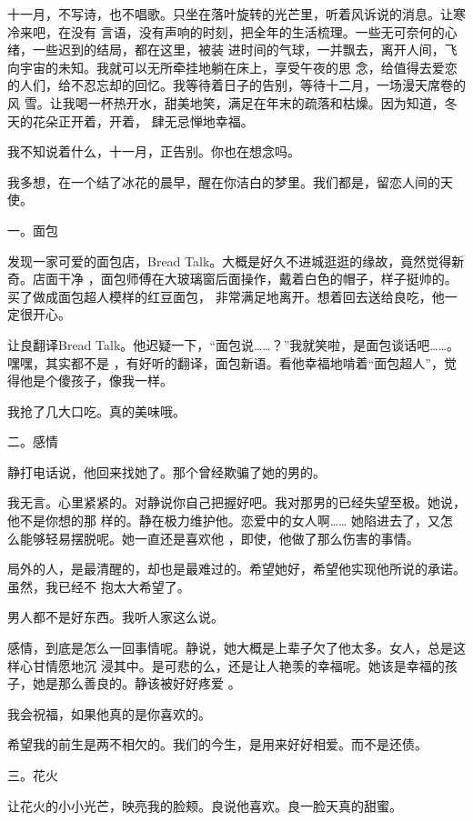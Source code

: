 \documentclass[12pt,a4paper]{article}
\newcommand{\subpart}[1]{
	\begingroup \par
	\vspace{1ex} \centering #1
	\par \endgroup \nopagebreak[4]
}
\begin{document}
		十一月，不写诗，也不唱歌。只坐在落叶旋转的光芒里，听着风诉说的消息。让寒冷来吧，在没有
	言语，没有声响的时刻，把全年的生活梳理。一些无可奈何的心绪，一些迟到的结局，都在这里，被装
	进时间的气球，一并飘去，离开人间，飞向宇宙的未知。我就可以无所牵挂地躺在床上，享受午夜的思
	念，给值得去爱恋的人们，给不忍忘却的回忆。我等待着日子的告别，等待十二月，一场漫天席卷的风
	雪。让我喝一杯热开水，甜美地笑，满足在年末的疏落和枯燥。因为知道，冬天的花朵正开着，开着，
	肆无忌惮地幸福。


		我不知说着什么，十一月，正告别。你也在想念吗。

		我多想，在一个结了冰花的晨早，醒在你洁白的梦里。我们都是，留恋人间的天使。

	\endwriting



		\subpart{一。面包}

		发现一家可爱的面包店，Bread Talk。大概是好久不进城逛逛的缘故，竟然觉得新奇。店面干净
	，面包师傅在大玻璃窗后面操作，戴着白色的帽子，样子挺帅的。买了做成面包超人模样的红豆面包，
	非常满足地离开。想着回去送给良吃，他一定很开心。

		让良翻译Bread Talk。他迟疑一下，“面包说……？”我就笑啦，是面包谈话吧……。嘿嘿，其实都不是
	，有好听的翻译，面包新语。看他幸福地啃着“面包超人”，觉得他是个傻孩子，像我一样。

		我抢了几大口吃。真的美味哦。

		\subpart{二。感情}

		静打电话说，他回来找她了。那个曾经欺骗了她的男的。

		我无言。心里紧紧的。对静说你自己把握好吧。我对那男的已经失望至极。她说，他不是你想的那
	样的。静在极力维护他。恋爱中的女人啊…… 她陷进去了，又怎么能够轻易摆脱呢。她一直还是喜欢他
	，即使，他做了那么伤害的事情。

		局外的人，是最清醒的，却也是最难过的。希望她好，希望他实现他所说的承诺。虽然，我已经不
	抱太大希望了。

		男人都不是好东西。我听人家这么说。

		感情，到底是怎么一回事情呢。静说，她大概是上辈子欠了他太多。女人，总是这样心甘情愿地沉
	浸其中。是可悲的么，还是让人艳羡的幸福呢。她该是幸福的孩子，她是那么善良的。静该被好好疼爱
	。

		我会祝福，如果他真的是你喜欢的。

		希望我的前生是两不相欠的。我们的今生，是用来好好相爱。而不是还债。

		\subpart{三。花火}

		让花火的小小光芒，映亮我的脸颊。良说他喜欢。良一脸天真的甜蜜。
\end{document}
